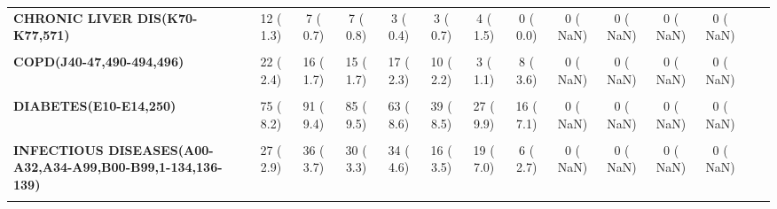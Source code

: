 \documentclass[
]{article}
\begin{document}
\begin{table}[H]
\begin{tabular}[t]{>{\raggedright\arraybackslash}p{5em}ccccccccccccc}
\textbf{CHRONIC LIVER DIS(K70-K77,571)} & 12 (  1.3) & 7 (  0.7) & 7 (  0.8) & 3 (  0.4) & 3 (  0.7) & 4 (  1.5) & 0 (  0.0) & 0 (  NaN) & 0 (  NaN) & 0 (  NaN) & 0 (  NaN) &  \vphantom{1} & \\
\textbf{\cellcolor{gray!10}{CONGENITAL ANOMALIES(Q00-Q99,740-759)}} & \cellcolor{gray!10}{1 (  0.1)} & \cellcolor{gray!10}{0 (  0.0)} & \cellcolor{gray!10}{1 (  0.1)} & \cellcolor{gray!10}{2 (  0.3)} & \cellcolor{gray!10}{0 (  0.0)} & \cellcolor{gray!10}{0 (  0.0)} & \cellcolor{gray!10}{0 (  0.0)} & \cellcolor{gray!10}{0 (  NaN)} & \cellcolor{gray!10}{0 (  NaN)} & \cellcolor{gray!10}{0 (  NaN)} & \cellcolor{gray!10}{0 (  NaN)} & \cellcolor{gray!10}{ \vphantom{1}} & \cellcolor{gray!10}{}\\
\textbf{COPD(J40-47,490-494,496)} & 22 (  2.4) & 16 (  1.7) & 15 (  1.7) & 17 (  2.3) & 10 (  2.2) & 3 (  1.1) & 8 (  3.6) & 0 (  NaN) & 0 (  NaN) & 0 (  NaN) & 0 (  NaN) &  \vphantom{1} & \\
\textbf{\cellcolor{gray!10}{CVA(I60-69,G45,430-438)}} & \cellcolor{gray!10}{50 (  5.5)} & \cellcolor{gray!10}{36 (  3.7)} & \cellcolor{gray!10}{44 (  4.9)} & \cellcolor{gray!10}{27 (  3.7)} & \cellcolor{gray!10}{21 (  4.6)} & \cellcolor{gray!10}{13 (  4.8)} & \cellcolor{gray!10}{7 (  3.1)} & \cellcolor{gray!10}{0 (  NaN)} & \cellcolor{gray!10}{0 (  NaN)} & \cellcolor{gray!10}{0 (  NaN)} & \cellcolor{gray!10}{0 (  NaN)} & \cellcolor{gray!10}{} & \cellcolor{gray!10}{}\\
\textbf{DIABETES(E10-E14,250)} & 75 (  8.2) & 91 (  9.4) & 85 (  9.5) & 63 (  8.6) & 39 (  8.5) & 27 (  9.9) & 16 (  7.1) & 0 (  NaN) & 0 (  NaN) & 0 (  NaN) & 0 (  NaN) &  \vphantom{1} & \\
\textbf{\cellcolor{gray!10}{HEART (I00-I09,I11,I13,I20-I51,390-398,402,404,410-429)}} & \cellcolor{gray!10}{387 ( 42.2)} & \cellcolor{gray!10}{436 ( 45.0)} & \cellcolor{gray!10}{359 ( 39.9)} & \cellcolor{gray!10}{292 ( 39.7)} & \cellcolor{gray!10}{196 ( 42.8)} & \cellcolor{gray!10}{102 ( 37.4)} & \cellcolor{gray!10}{94 ( 41.8)} & \cellcolor{gray!10}{0 (  NaN)} & \cellcolor{gray!10}{0 (  NaN)} & \cellcolor{gray!10}{0 (  NaN)} & \cellcolor{gray!10}{0 (  NaN)} & \cellcolor{gray!10}{} & \cellcolor{gray!10}{}\\
\textbf{INFECTIOUS DISEASES(A00-A32,A34-A99,B00-B99,1-134,136-139)} & 27 (  2.9) & 36 (  3.7) & 30 (  3.3) & 34 (  4.6) & 16 (  3.5) & 19 (  7.0) & 6 (  2.7) & 0 (  NaN) & 0 (  NaN) & 0 (  NaN) & 0 (  NaN) &  \vphantom{1} & \\
\textbf{\cellcolor{gray!10}{INFLUENZA \& PNEUMONIA(J10-J18,480-487)}} & \cellcolor{gray!10}{20 (  2.2)} & \cellcolor{gray!10}{20 (  2.1)} & \cellcolor{gray!10}{13 (  1.4)} & \cellcolor{gray!10}{11 (  1.5)} & \cellcolor{gray!10}{5 (  1.1)} & \cellcolor{gray!10}{6 (  2.2)} & \cellcolor{gray!10}{2 (  0.9)} & \cellcolor{gray!10}{0 (  NaN)} & \cellcolor{gray!10}{0 (  NaN)} & \cellcolor{gray!10}{0 (  NaN)} & \cellcolor{gray!10}{0 (  NaN)} & \cellcolor{gray!10}{ \vphantom{1}} & \cellcolor{gray!10}{}\\

\end{tabular}
\end{table}
\end{document}
